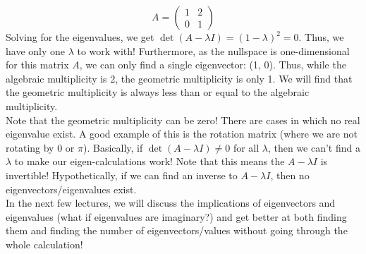 \documentclass[12pt]{amsart}
\begin{document}
\[A = \begin{pmatrix}1&2\\0&1\end{pmatrix}\]
Solving for the eigenvalues, we get $\det(A - \lambda I) = (1 - \lambda)^2 = 0$. Thus, we have only one $\lambda$ to work with! Furthermore, as the nullspace is one-dimensional for this matrix $A$, we can only find a single eigenvector: (1, 0). Thus, while the algebraic multiplicity is 2, the geometric multiplicity is only 1. We will find that the geometric multiplicity is always less than or equal to the algebraic multiplicity.\\
Note that the geometric multiplicity can be zero! There are cases in which no real eigenvalue exist. A good example of this is the rotation matrix (where we are not rotating by 0 or $\pi$). Basically, if $\det (A - \lambda I) \neq 0$ for all $\lambda$, then we can't find a $\lambda$ to make our eigen-calculations work! Note that this means the $A - \lambda I$ is invertible! Hypothetically, if we can find an inverse to $A - \lambda I$, then no eigenvectors/eigenvalues exist.\\
In the next few lectures, we will discuss the implications of eigenvectors and eigenvalues (what if eigenvalues are imaginary?) and get better at both finding them and finding the number of eigenvectors/values without going through the whole calculation!
\end{document}

